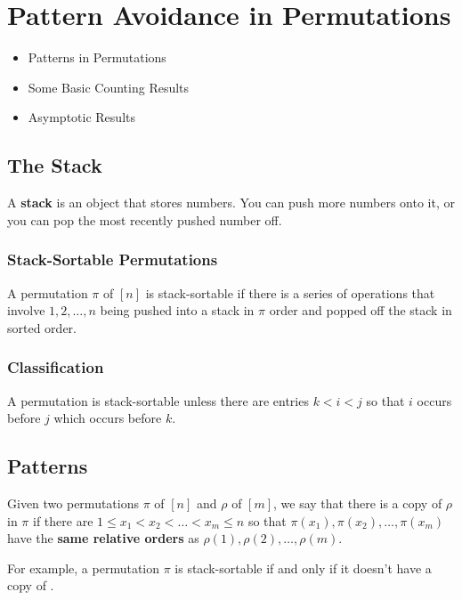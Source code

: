 \documentclass[letterpaper]{article}
\begin{document}
\newpage 

\section{Pattern Avoidance in Permutations}
\begin{itemize}
    \item Patterns in Permutations 
    \item Some Basic Counting Results 
    \item Asymptotic Results 
\end{itemize}

\subsection{The Stack}
A \textbf{stack} is an object that stores numbers. You can push more numbers onto it, or you can pop the most recently pushed number off. 

\subsubsection{Stack-Sortable Permutations}
\begin{definition}{}{}
    A permutation $\pi$ of $[n]$ is stack-sortable if there is a series of operations that involve $1, 2, \dots, n$ being pushed into a stack in $\pi$ order and popped off the stack in sorted order. 
\end{definition}

\subsubsection{Classification}
\begin{theorem}{}{}
    A permutation is stack-sortable unless there are entries $k < i < j$ so that $i$ occurs before $j$ which occurs before $k$. 
\end{theorem}

\subsection{Patterns}
\begin{definition}{}{}
    Given two permutations $\pi$ of $[n]$ and $\rho$ of $[m]$, we say that there is a copy of $\rho$ in $\pi$ if there are $1 \leq x_1 < x_2 < \dots < x_m \leq n$ so that $\pi(x_1), \pi(x_2), \dots, \pi(x_m)$ have the \textbf{same relative orders} as $\rho(1), \rho(2), \dots, \rho(m)$. 
\end{definition}
For example, a permutation $\pi$ is stack-sortable if and only if it doesn't have a copy of . 
\end{document}
